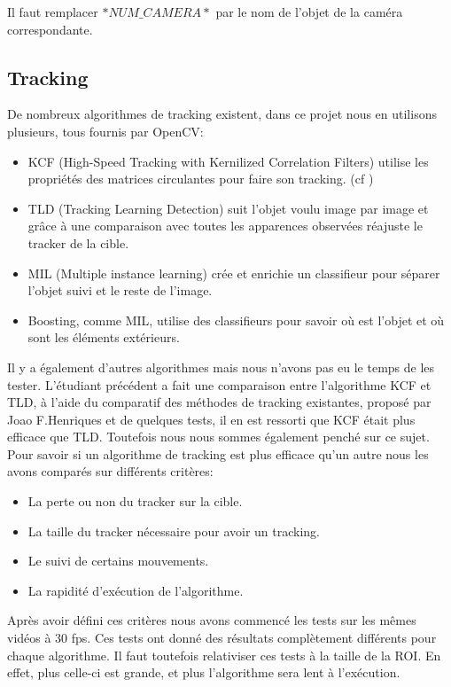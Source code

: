 Il faut remplacer $*NUM\_CAMERA*$ par le nom de l'objet de la caméra correspondante.

\subsection{Tracking}

De nombreux algorithmes de tracking existent, dans ce projet nous en utilisons plusieurs, tous fournis par OpenCV:
\begin{itemize}
\item KCF (High-Speed Tracking with Kernilized Correlation Filters) utilise les propriétés des matrices circulantes pour faire son tracking. (cf \cite{kernelized_correlation_filters})
\item TLD (Tracking Learning Detection) suit l'objet voulu image par image et grâce à une comparaison avec toutes les apparences observées réajuste le tracker de la cible. 
\item MIL (Multiple instance learning) crée et enrichie un classifieur pour sé\-pa\-rer l'objet suivi et le reste de l'image.
\item Boosting, comme MIL, utilise des classifieurs pour savoir où est l'objet et où sont les éléments extérieurs. 
\end{itemize}
Il y a également d'autres algorithmes mais nous n'avons pas eu le temps de les tester.
L'étudiant précédent a fait une comparaison entre l'algorithme KCF et TLD, à l'aide du comparatif des méthodes de tracking existantes, proposé par Joao F.Henriques et de quelques tests, il en est ressorti que KCF était plus efficace que TLD. 
Toutefois nous nous sommes également penché sur ce sujet. Pour savoir si un algorithme de tracking est plus efficace qu'un autre nous les avons comparés sur différents critères: 
\begin{itemize}
\item La perte ou non du tracker sur la cible.
\item La taille du tracker nécessaire pour avoir un tracking.
\item Le suivi de certains mouvements.
\item La rapidité d'exécution de l'algorithme.
\end{itemize}
Après avoir défini ces critères nous avons commencé les tests sur les mêmes vidéos à 30 fps. Ces tests ont donné des résultats complètement différents pour chaque algorithme. Il faut toutefois relativiser ces tests à la taille de la ROI. En effet, plus celle-ci est grande, et plus l'algorithme sera lent à l'exécution.

